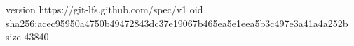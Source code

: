 version https://git-lfs.github.com/spec/v1
oid sha256:acec95950a4750b49472843dc37e19067b465ea5e1eea5b3c497e3a41a4a252b
size 43840
